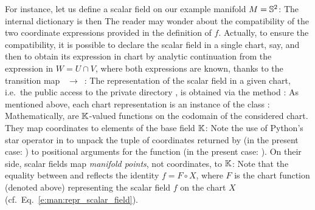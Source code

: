 For instance, let us define a scalar field on our example manifold $M=\mathbb{S}^2$:
The internal dictionary  is then
The reader may wonder about the compatibility of the two coordinate expressions
provided in the definition of $f$. Actually, to ensure the compatibility, it
is possible to declare the scalar field in a single chart,  say,
and then to obtain its expression in chart  by analytic continuation
from the expression in $W=U\cap V$, where both expressions are known, thanks
to the transition map ~$\to$~:
The representation of the scalar field in a given chart, i.e.\ the public access
to the private directory , is obtained via the method :
As mentioned above, each chart representation is an instance of the
class :
Mathematically,  are $\mathbb{K}$-valued functions on the codomain of
the considered chart. They map coordinates to elements of the base field $\mathbb{K}$:
Note the use of Python's star operator in  to unpack the tuple of coordinates
returned by  (in the present case: ) to positional arguments
for the function  (in the present case: ).
On their side, scalar fields map \emph{manifold points}, not coordinates, to $\mathbb{K}$:
Note that the equality between  and 
reflects the identity $f = F \circ X$, where $F$ is the chart function
(denoted  above)
representing the scalar field $f$ on the chart $X$
(cf.\ Eq.~\eqref{e:man:repr_scalar_field}).

